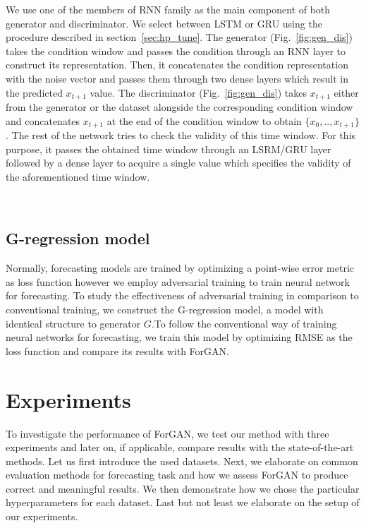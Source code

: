 \documentclass{ieeeaccess}
\begin{document}
We use one of the members of RNN family as the main component of both generator and discriminator. We select between LSTM or GRU using the procedure described in section~\ref{sec:hp_tune}. The generator (Fig.~\ref{fig:gen_dis}) takes the condition window and passes the condition through an RNN layer to construct its representation. Then, it concatenates the condition representation with the noise vector and passes them through two dense layers which result in the predicted $x_{t+1}$ value. The discriminator (Fig.~\ref{fig:gen_dis}) takes $x_{t+1}$ either from the generator or the dataset alongside the corresponding condition  window and concatenates $x_{t+1}$ at the end of the condition window to obtain $\{x_0,.., x_{t+1}\}$. The rest of the network tries to check the validity of this time window. For this purpose, it passes the obtained time window through an LSRM/GRU layer followed by a dense layer to acquire a single value which specifies the validity of the  aforementioned time window.

\begin{figure*}[t]
	\centering
	\\
	\caption{(a): The architecture of the generator in detail. The generator takes noise vector and a time windows and forecasts the value of next step ($x_{t+1}$) . (b): The architecture of the discriminator in detail. The discriminator receives $x_{t+1}$ and time window and determines if $x_{t+1}$ is valid.}
	\label{fig:gen_dis} 
\end{figure*}


\subsection{G-regression model}

Normally, forecasting models are trained by optimizing a point-wise error metric as loss function however we employ adversarial training to train neural network for forecasting. To study the effectiveness of adversarial training in comparison to conventional training, we construct the G-regression model, a model with identical structure to generator $G$.To follow the conventional way of training neural networks for forecasting, we train this model by optimizing RMSE as the loss function and compare its results with ForGAN.


\section{Experiments}
\label{sec:experiments}
To investigate the performance of ForGAN, we test our method with three experiments and later on, if applicable, compare results with the state-of-the-art methods. Let us first introduce the used datasets. Next, we elaborate on common evaluation methods for forecasting task and how we assess ForGAN to produce correct and meaningful results. We then demonstrate how we chose the particular hyperparameters for each dataset. Last but not least we elaborate on the setup of our experiments.
\end{document}
